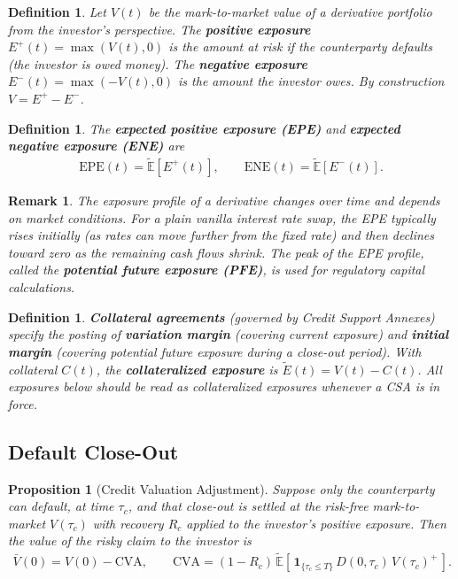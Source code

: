 \documentclass{report}
\theoremstyle{spacedplain}
\newtheorem{proposition}[theorem]{Proposition}
\theoremstyle{spaceddefinition}
\newtheorem{definition}[theorem]{Definition}
\theoremstyle{spacedremark}
\newtheorem{remark}[theorem]{Remark}
\begin{document}
\begin{definition}
Let $V(t)$ be the mark-to-market value of a derivative portfolio from the investor's perspective. The \textbf{positive exposure} $E^+(t) = \max(V(t), 0)$ is the amount at risk if the counterparty defaults (the investor is owed money). The \textbf{negative exposure} $E^-(t) = \max(-V(t), 0)$ is the amount the investor owes. By construction $V=E^+-E^-$.
\end{definition}

\begin{definition}
The \textbf{expected positive exposure (EPE)} and \textbf{expected negative exposure (ENE)} are
\begin{align}
    \text{EPE}(t) = \widetilde{\mathbb{E}}[E^+(t)], \qquad \text{ENE}(t) = \widetilde{\mathbb{E}}[E^-(t)].
\end{align}
\end{definition}

\begin{remark}
The exposure profile of a derivative changes over time and depends on market conditions. For a plain vanilla interest rate swap, the EPE typically rises initially (as rates can move further from the fixed rate) and then declines toward zero as the remaining cash flows shrink. The peak of the EPE profile, called the \textbf{potential future exposure (PFE)}, is used for regulatory capital calculations.
\end{remark}

\begin{definition}
\textbf{Collateral agreements} (governed by Credit Support Annexes) specify the posting of \textbf{variation margin} (covering current exposure) and \textbf{initial margin} (covering potential future exposure during a close-out period). With collateral $C(t)$, the \textbf{collateralized exposure} is $\widetilde{E}(t) = V(t) - C(t)$. All exposures below should be read as collateralized exposures whenever a CSA is in force.
\end{definition}


\subsection{Default Close-Out}


\begin{proposition}[Credit Valuation Adjustment]\label{prop:cva}
Suppose only the counterparty can default, at time $\tau_c$, and that close-out is settled at the risk-free mark-to-market $V(\tau_c)$ with recovery $R_c$ applied to the investor's positive exposure. Then the value of the risky claim to the investor is
\begin{align}
    \bar V(0) = V(0) - \text{CVA}, \qquad
    \text{CVA} = (1-R_c)\,\widetilde{\mathbb{E}}\!\left[\,\mathbf{1}_{\{\tau_c \le T\}}\,D(0,\tau_c)\,V(\tau_c)^+\,\right].
\end{align}
\end{proposition}
\end{document}
